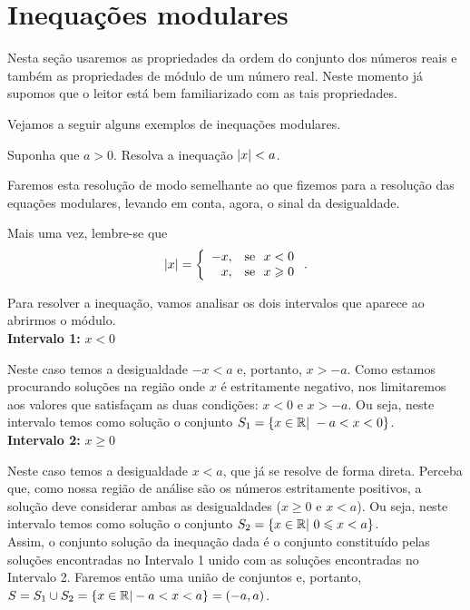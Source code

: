  \section{Inequações modulares}

 Nesta seção usaremos as propriedades da ordem do conjunto dos números reais e também as propriedades de módulo de um número real. Neste momento já supomos que o leitor está bem familiarizado com as tais propriedades.%

Vejamos a seguir alguns exemplos de inequações modulares.

 \begin{exem} 
  Suponha que $a> 0$. Resolva a inequação $\left|x\right| < a$.

Faremos esta resolução de modo semelhante ao que fizemos para a resolução das equações modulares, levando em conta, agora, o sinal da desigualdade.

Mais uma vez, lembre-se que 
 \[
\left|x\right|= \left\{\begin{array}{rl}
      -x , & \text{se} \ \ x<0 \\
      x , & \text{se} \ \ x \geqslant 0
     \end{array}\right. .
\]

Para resolver a inequação, vamos analisar os dois intervalos que aparece ao abrirmos o módulo.\\

\textbf{Intervalo 1:} $x < 0$

Neste caso temos a desigualdade $-x < a$ e, portanto, $x > -a$. Como estamos procurando soluções na região onde $x$ é estritamente negativo, nos limitaremos aos valores que satisfaçam as duas condições: $x < 0$ e $x > -a$. Ou seja, neste intervalo temos como solução o conjunto $S_1 = \{x \in \mathbb{R} | \ -a < x < 0\}$.\\

\textbf{Intervalo 2:} $x\geq 0$

Neste caso temos a desigualdade $x<a$, que já se resolve de forma direta. Perceba que, como nossa região de análise são os números estritamente positivos, a solução deve considerar ambas as desigualdades ($x \geq 0$ e $x < a$). Ou seja, neste intervalo temos como solução o conjunto $S_2 = \{x \in \mathbb{R} | \ 0 \leqslant x < a\}$.\\



Assim, o conjunto solução da inequação dada é o conjunto constituído pelas soluções encontradas no Intervalo 1 unido com as soluções encontradas no Intervalo 2. Faremos então uma união de conjuntos e, portanto, $S = S_1 \cup S_2 = \{x \in \mathbb{R}| -a < x < a\} = (-a,a)$.


\end{exem}
